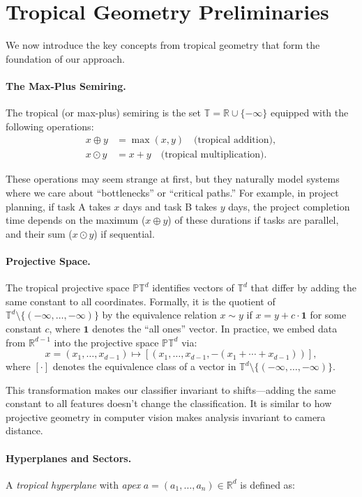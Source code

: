 \documentclass{article}
\newcommand{\R}{\mathbb{R}}
\newcommand{\trop}{\mathbb{T}}
\newcommand{\proj}{\mathbb{P}}
\begin{document}
\section{Tropical Geometry Preliminaries}\label{sec:prelim}

We now introduce the key concepts from tropical geometry that form the foundation of our approach.

\paragraph{The Max-Plus Semiring.}
The tropical (or max-plus) semiring is the set $\trop = \R \cup \{-\infty\}$
equipped with the following operations:
\begin{align}
x \oplus y &= \max(x,y) \quad \text{(tropical addition)}, \\
x \odot y &= x + y \quad \text{(tropical multiplication)}.
\end{align}

These operations may seem strange at first, but they naturally model systems where we care about ``bottlenecks'' or ``critical paths.'' For example, in project planning, if task A takes $x$ days and task B takes $y$ days, the project completion time depends on the maximum ($x \oplus y$) of these durations if tasks are parallel, and their sum ($x \odot y$) if sequential.

\paragraph{Projective Space.}  
The tropical projective space $\proj \trop^d$ identifies vectors of $\trop^d$ that differ by adding the same constant to all coordinates. Formally, it is the quotient of $\trop^d \setminus \{(-\infty,\dots,-\infty)\}$ by the equivalence relation $x \sim y$ if $x = y + c \cdot \mathbf{1}$ for some constant $c$, where $\mathbf{1}$ denotes the ``all ones'' vector. In practice, we embed data from $\R^{d-1}$ into the projective space $\proj \trop^d$ via:
\[
x=(x_1,\dots,x_{d-1})\mapsto [(x_1,\dots,x_{d-1},-(x_1+\cdots+x_{d-1}))],
\]
where $[\cdot]$ denotes the equivalence class of a vector in  $\trop^d \setminus \{(-\infty,\dots,-\infty)\}$.

This transformation makes our classifier invariant to shifts—adding the same constant to all features doesn't change the classification. It is similar to how projective geometry in computer vision makes analysis invariant to camera distance.

\paragraph{Hyperplanes and Sectors.}
A {\em tropical hyperplane} with {\em apex} $a=(a_1,\dots,a_n) \in \R^d$ is defined as:
\end{document}
